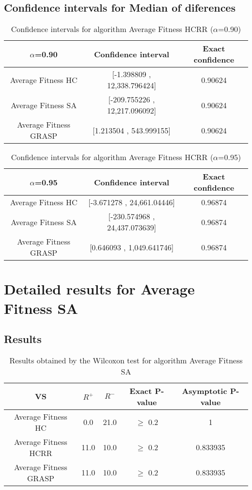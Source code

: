 \documentclass[a4paper,10pt]{article}
\begin{document}
\subsection{Confidence intervals for Median of diferences}

\begin{table}[!htp]
\centering\small
\begin{tabular}{
|c|c|c|}
\hline
 $\alpha$=0.90 & Confidence interval & Exact confidence \\ \hline 
Average Fitness HC     & [-1.398809 , 12,338.796424] & 0.90624\\ \hline 
Average Fitness SA   & [-209.755226 , 12,217.096092] & 0.90624\\ \hline 
Average Fitness GRASP & [1.213504 , 543.999155] & 0.90624\\ \hline 

\end{tabular}
\caption{Confidence intervals for algorithm Average Fitness HCRR    ($\alpha$=0.90)}
\end{table}
\begin{table}[!htp]
\centering\small
\begin{tabular}{
|c|c|c|}
\hline
 $\alpha$=0.95 & Confidence interval & Exact confidence \\ \hline 
Average Fitness HC     & [-3.671278 , 24,661.04446] & 0.96874\\ \hline 
Average Fitness SA   & [-230.574968 , 24,437.073639] & 0.96874\\ \hline 
Average Fitness GRASP & [0.646093 , 1,049.641746] & 0.96874\\ \hline 

\end{tabular}
\caption{Confidence intervals for algorithm Average Fitness HCRR    ($\alpha$=0.95)}
\end{table}

 \clearpage 


\section{Detailed results for Average Fitness SA  }


\subsection{Results}

\begin{table}[!htp]
\centering\small
\begin{tabular}{
|c|c|c|c|c|}
\hline
 VS & $R^{+}$ & $R^{-}$ & Exact P-value & Asymptotic P-value \\ \hline 
Average Fitness HC     & 0.0 & 21.0 & $\geq$ 0.2 & 1\\ \hline 
Average Fitness HCRR    & 11.0 & 10.0 & $\geq$ 0.2 & 0.833935\\ \hline 
Average Fitness GRASP & 11.0 & 10.0 & $\geq$ 0.2 & 0.833935\\ \hline 

\end{tabular}
\caption{Results obtained by the Wilcoxon test for algorithm Average Fitness SA  }
\end{table}
\end{document}
